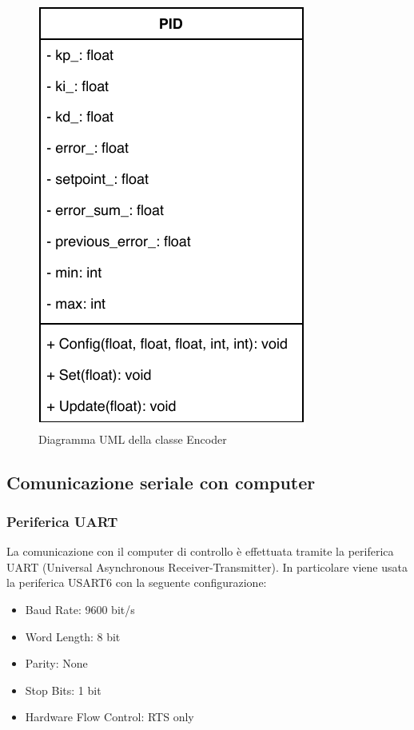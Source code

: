 \begin{figure}[htb]
    \centering
    \includegraphics[scale=0.80]{images/pid_class.pdf}
    \caption{Diagramma UML della classe Encoder}
    \label{fig:pid_class}
\end{figure}


\cite{cross_pid}



\subsection{Comunicazione seriale con computer}


\subsubsection{Periferica UART}
La comunicazione con il computer di controllo è effettuata tramite la periferica UART (Universal Asynchronous Receiver-Transmitter). In particolare viene usata la periferica USART6 con la seguente configurazione:

\begin{itemize}
    \item Baud Rate: 9600 bit/s
    \item Word Length: 8 bit
    \item Parity: None
    \item Stop Bits: 1 bit
    \item Hardware Flow Control: RTS only
\end{itemize}


